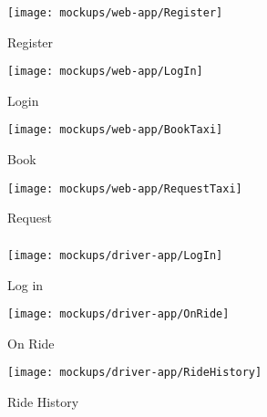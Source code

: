 \newpage
\subsubsection{ }
\vfill
\begin{figure}[h!t]
\caption{Register}
\texttt{[image: mockups/web-app/Register]}
\centering
\end{figure}
\vfill
\clearpage

\newpage
\vfill
\begin{figure}[h!t]
\caption{Login}
\texttt{[image: mockups/web-app/LogIn]}
\centering
\end{figure}
\vfill
\clearpage

\newpage
\vfill
\begin{figure}[h!t]
\caption{Book}
\texttt{[image: mockups/web-app/BookTaxi]}
\centering
\end{figure}
\vfill
\clearpage

\newpage
\vfill
\begin{figure}[h!t]
\caption{Request}
\texttt{[image: mockups/web-app/RequestTaxi]}
\centering
\end{figure}
\vfill
\clearpage

\newpage
\subsubsection{ }
\vfill
\begin{figure*}[h!t]
    \centering
    \begin{subfigure}[h!t]{0.25\paperwidth}
            \texttt{[image: mockups/driver-app/LogIn]}
            \caption{Log in}
    \end{subfigure}
    \hspace{0.05\paperwidth}
    \begin{subfigure}[h!t]{0.25\paperwidth}
            \texttt{[image: mockups/driver-app/OnRide]}
            \caption{On Ride}
    \end{subfigure}
    \hspace{0.05\paperwidth}
    \begin{subfigure}[h!t]{0.25\paperwidth}
            \texttt{[image: mockups/driver-app/RideHistory]}
            \caption{Ride History}
    \end{subfigure}
\end{figure*}
\vfill
\clearpage


